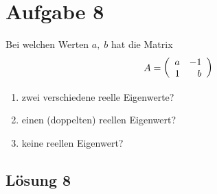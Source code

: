 \documentclass[main.tex]{subfiles}
\begin{document}
\section{Aufgabe 8}
Bei welchen Werten $a,\; b$ hat die Matrix
$$
    A = \eqmatrix{rr}{a & -1 \\ 1 & b}
$$
\begin{enumerate}
    \item zwei verschiedene reelle Eigenwerte?
    \item einen (doppelten) reellen Eigenwert?
    \item keine reellen Eigenwert?
\end{enumerate}

\subsection{Lösung 8}
\end{document}
